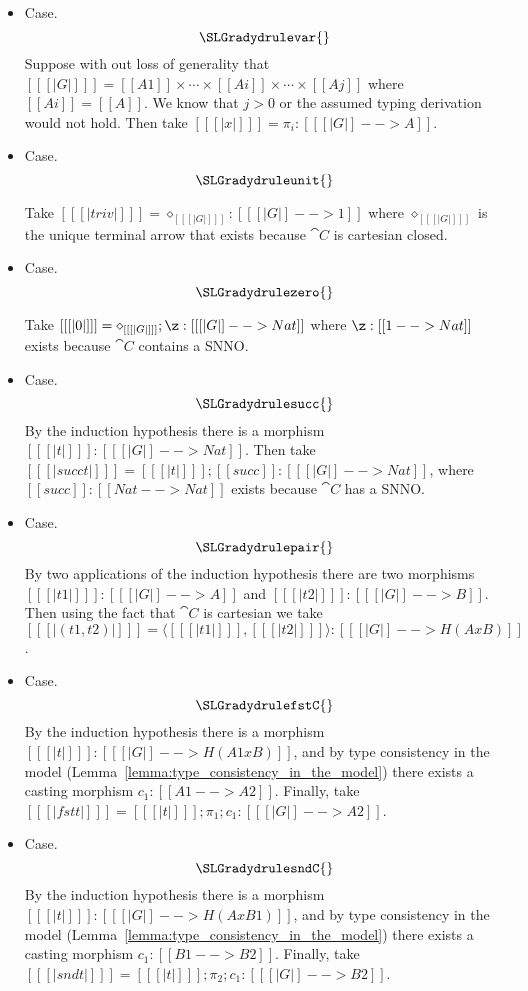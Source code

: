 \begin{itemize} 
\item[] Case.
  \[
  \SLGradydrulevar{}
  \]
  Suppose with out loss of generality that $[[ [| G |] ]] = [[A1]]
  \times \cdots \times [[Ai]] \times \cdots \times [[Aj]]$ where
  $[[Ai]] = [[A]]$.  We know that $j > 0$ or the assumed typing
  derivation would not hold.  Then take
  $[[ [| x |] ]] = \pi_i : [[ [| G |] --> A]]$.

\item[] Case.
  \[
  \SLGradydruleunit{}
  \]

  Take $[[ [| triv |] ]] = \diamond_{[[ [| G |] ]]} : [[ [| G |] -->
      1]]$ where $\diamond_{[[ [| G |] ]]}$ is the unique terminal
  arrow that exists because $\cat{C}$ is cartesian closed.
  
\item[] Case.
  \[
  \SLGradydrulezero{}
  \]

  Take $[[ [| 0 |] ]] = \diamond_{[[ [| G |] ]]};\z : [[ [| G |] --> Nat]]$
  where $\z : [[1 --> Nat]]$ exists because $\cat{C}$
  contains a SNNO.

\item[] Case.
  \[
  \SLGradydrulesucc{}
  \]
  By the induction hypothesis there is a morphism \\ $[[ [| t |] ]] : [[ [| G |] --> Nat]]$.  Then
  take $[[ [| succ t |] ]] = [[ [| t |] ]];[[succ]] : [[ [| G |] --> Nat ]]$, where
  $[[succ]] : [[Nat --> Nat]]$ exists because $\cat{C}$ has a SNNO.
  
\item[] Case.
  \[
  \SLGradydrulepair{}
  \]
  By two applications of the induction hypothesis there are two morphisms
  $[[ [| t1 |] ]] : [[ [| G |] --> A]]$ and $[[ [| t2 |] ]] : [[ [| G |] --> B]]$.
  Then using the fact that $\cat{C}$ is cartesian we take
  $[[ [| (t1 , t2) |] ]] = \langle [[ [| t1 |] ]] , [[ [| t2 |] ]] \rangle : [[ [| G |] --> H(A x B)]]$.

\item[] Case.
  \[
  \SLGradydrulefstC{}
  \]
  By the induction hypothesis there is a morphism \\ $[[ [| t |] ]] :
  [[ [| G |] --> H(A1 x B) ]]$, and by type consistency in the model
  (Lemma~\ref{lemma:type_consistency_in_the_model}) there exists a
  casting morphism $c_1 : [[A1 --> A2]]$.
  Finally, take $[[ [| fst t |] ]] = [[ [| t |] ]];\pi_1;c_1 : [[ [| G |] --> A2]]$.

\item[] Case.
  \[
  \SLGradydrulesndC{}
  \]
  By the induction hypothesis there is a morphism \\ $[[ [| t |] ]] :
  [[ [| G |] --> H(A x B1) ]]$, and by type consistency in the model
  (Lemma~\ref{lemma:type_consistency_in_the_model}) there exists a
  casting morphism $c_1 : [[B1 --> B2]]$.
  Finally, take $[[ [| snd t |] ]] = [[ [| t |] ]];\pi_2;c_1 : [[ [| G |] --> B2]]$.


\end{itemize}
